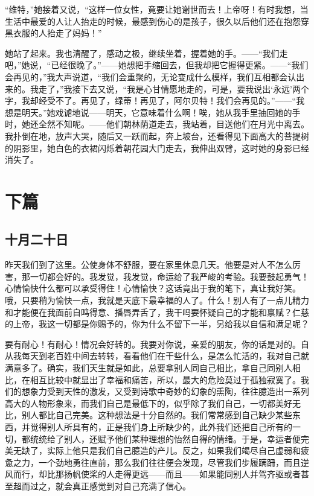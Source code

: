 \documentclass[12pt,oneside]{book}
\begin{document}
“维特，”她接着又说，“这样一位女性，竟要让她谢世而去！上帝呀！有时我想，当生活中最爱的人让人抬走的时候，最感到伤心的是孩子，很久以后他们还在抱怨穿黑衣服的人抬走了妈妈！”

她站了起来。我也清醒了，感动之极，继续坐着，握着她的手。——“我们走吧，”她说，“已经很晚了。”——她想把手缩回去，但我却把它握得更紧。——“我们会再见的，”我大声说道，“我们会重聚的，无论变成什么模样，我们互相都会认出来的。我走了，”我接下去又说，“我是心甘情愿地走的，可是，要我说出‘永远’两个字，我却经受不了。再见了，绿蒂！再见了，阿尔贝特！我们会再见的。”——“我想是明天。”她戏谑地说——明天，它意味着什么啊！唉，她从我手里抽回她的手时，她还全然不知呢。——他们朝林荫道走去，我站着，目送他们在月光中离去。我扑倒在地，放声大哭，随后又一跃而起，奔上坡台，还看得见下面高大的菩提树的阴影里，她白色的衣裙闪烁着朝花园大门走去，我伸出双臂，这时她的身影已经消失了。



\part{下篇}
\chapter{十月二十日}
昨天我们到了这里。公使身体不舒服，要在家里休息几天。他要是对人不怎么厉害，那一切都会好的。我发觉，我发觉，命运给了我严峻的考验。我要鼓起勇气！心情愉快什么都可以承受得住！心情愉快？这话竟出于我的笔下，真让我好笑。哦，只要稍为愉快一点，我就是天底下最幸福的人了。什么！别人有了一点儿精力和才能便在我面前自鸣得意、播唇弄舌了，我干吗要怀疑自己的才能和禀赋？仁慈的上帝，我这一切都是你赐予的，你为什么不留下一半，另给我以自信和满足呢？

要有耐心！有耐心！情况会好转的。我要对你说，亲爱的朋友，你的话是对的。自从我每天到老百姓中间去转转，看看他们在干些什么，是怎么忙活的，我对自己就满意多了。确实，我们天生就是如此，总要拿别人同自己相比，拿自己同别人相比，在相互比较中就显出了幸福和痛苦，所以，最大的危险莫过于孤独寂寞了。我们的想象力受到天性的激发，又受到诗歌中奇妙的幻象的熏陶，往往臆造出一系列高大的人物形象来，而我们自己是最低下的，似乎除了我们自己，一切都美好无比，别人都比自己完美。这种想法是十分自然的。我们常常感到自己缺少某些东西，并觉得别人所具有的，正是我们身上所缺少的，此外我们还把自己所有的一切，都统统给了别人，还赋予他们某种理想的怡然自得的情绪。于是，幸运者便完美无缺了，实际上他只是我们自己臆造的产儿。反之，如果我们竭尽自己虚弱和疲惫之力，一个劲地勇往直前，那么我们往往便会发现，尽管我们步履蹒跚，而且逆风而行，却比那扬帆使桨的人走得更远——而且——如果能同别人并驾齐驱或者甚至超而过之，就会真正感觉到对自己充满了信心。
　　
\end{document}
